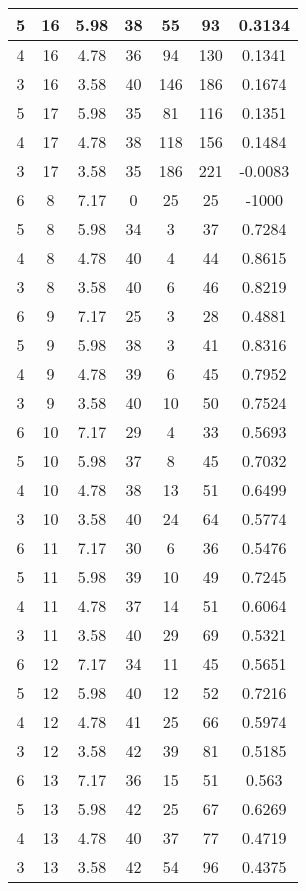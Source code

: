 \documentclass[letterpaper, 12pt]{article}
\begin{document}
\begin{longtable}{|c|c|c|c|c|c|c|}
\hline
5 & 16 & 5.98 & 38 & 55 & 93 & 0.3134 \\
\hline
4 & 16 & 4.78 & 36 & 94 & 130 & 0.1341 \\
\hline
3 & 16 & 3.58 & 40 & 146 & 186 & 0.1674 \\
\hline
5 & 17 & 5.98 & 35 & 81 & 116 & 0.1351 \\
\hline
4 & 17 & 4.78 & 38 & 118 & 156 & 0.1484 \\
\hline
3 & 17 & 3.58 & 35 & 186 & 221 & -0.0083 \\
\hline
6 & 8 & 7.17 & 0 & 25 & 25 & -1000 \\
\hline
5 & 8 & 5.98 & 34 & 3 & 37 & 0.7284 \\
\hline
4 & 8 & 4.78 & 40 & 4 & 44 & 0.8615 \\
\hline
3 & 8 & 3.58 & 40 & 6 & 46 & 0.8219 \\
\hline
6 & 9 & 7.17 & 25 & 3 & 28 & 0.4881 \\
\hline
5 & 9 & 5.98 & 38 & 3 & 41 & 0.8316 \\
\hline
4 & 9 & 4.78 & 39 & 6 & 45 & 0.7952 \\
\hline
3 & 9 & 3.58 & 40 & 10 & 50 & 0.7524 \\
\hline
6 & 10 & 7.17 & 29 & 4 & 33 & 0.5693 \\
\hline
5 & 10 & 5.98 & 37 & 8 & 45 & 0.7032 \\
\hline
4 & 10 & 4.78 & 38 & 13 & 51 & 0.6499 \\
\hline
3 & 10 & 3.58 & 40 & 24 & 64 & 0.5774 \\
\hline
6 & 11 & 7.17 & 30 & 6 & 36 & 0.5476 \\
\hline
5 & 11 & 5.98 & 39 & 10 & 49 & 0.7245 \\
\hline
4 & 11 & 4.78 & 37 & 14 & 51 & 0.6064 \\
\hline
3 & 11 & 3.58 & 40 & 29 & 69 & 0.5321 \\
\hline
6 & 12 & 7.17 & 34 & 11 & 45 & 0.5651 \\
\hline
5 & 12 & 5.98 & 40 & 12 & 52 & 0.7216 \\
\hline
4 & 12 & 4.78 & 41 & 25 & 66 & 0.5974 \\
\hline
3 & 12 & 3.58 & 42 & 39 & 81 & 0.5185 \\
\hline
6 & 13 & 7.17 & 36 & 15 & 51 & 0.563 \\
\hline
5 & 13 & 5.98 & 42 & 25 & 67 & 0.6269 \\
\hline
4 & 13 & 4.78 & 40 & 37 & 77 & 0.4719 \\
\hline
3 & 13 & 3.58 & 42 & 54 & 96 & 0.4375 \\

\end{longtable}
\end{document}
